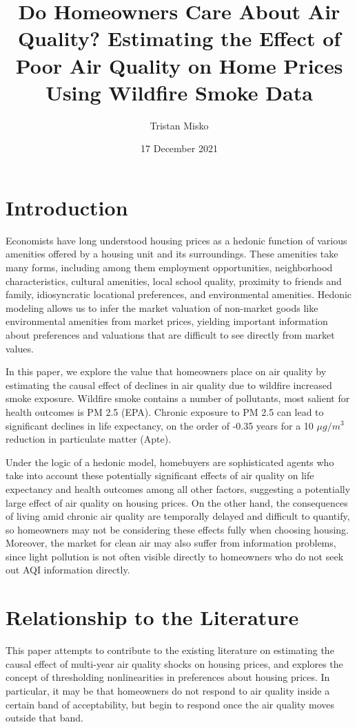 \documentclass[12pt]{article}
\title{\vspace{-2.5cm}\Large{Do Homeowners Care About Air Quality? Estimating the Effect of Poor Air Quality on Home Prices Using Wildfire Smoke Data}}
\author{\normalsize Tristan Misko}
\date{\normalsize{17 December 2021}}
\begin{document}
	\maketitle
	\doublespacing
	
\section{Introduction} 

Economists have long understood housing prices as a hedonic function of various amenities offered by a housing unit and its surroundings.  These amenities take many forms, including among them employment opportunities, neighborhood characteristics, cultural amenities, local school quality, proximity to friends and family, idiosyncratic locational preferences, 
and environmental amenities.   Hedonic modeling allows us to infer the market valuation of non-market goods like environmental amenities from market prices, yielding important information about preferences and valuations that are difficult to see directly from market values.

In this paper, we explore the value that homeowners place on air quality by estimating the causal effect of declines in air quality due to wildfire increased smoke exposure.  Wildfire smoke contains a number of pollutants, most salient for health outcomes is PM 2.5 (EPA).  Chronic exposure to PM 2.5 can lead to significant declines in life expectancy, on the order of -0.35 years for a 10 $\mu g/m^3$ reduction in particulate matter (Apte).  

Under the logic of a hedonic model, homebuyers are sophisticated agents who take into account these potentially significant effects of air quality on life expectancy and health outcomes among all other factors, suggesting a potentially large effect of air quality on housing prices.  On the other hand, the consequences of living amid chronic air quality are temporally delayed and difficult to quantify, so homeowners may not be considering these effects fully when choosing housing.  Moreover, the market for clean air may also suffer from information problems, since light pollution is not often visible directly to homeowners who do not seek out AQI information directly.  


\section{Relationship to the Literature}

This paper attempts to contribute to the existing literature on estimating the causal effect of multi-year air quality shocks on housing prices, and explores the concept of thresholding nonlinearities in preferences about housing prices.  In particular, it may be that homeowners do not respond to air quality inside a certain band of acceptability, but begin to respond once the air quality moves outside that band.
\end{document}
